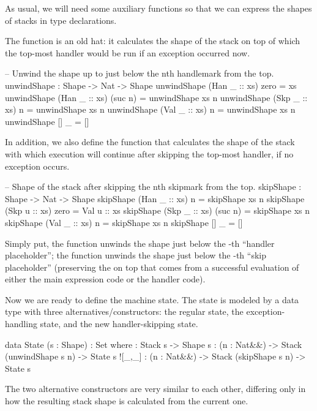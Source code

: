 As usual, we will need some auxiliary functions so that we can express the
shapes of stacks in type declarations.

The function  is an old hat: it calculates the shape of the stack
on top of which the top-most handler would be run if an exception occurred now.
\begin{code}
  -- Unwind the shape up to just below the n\-th handle\-mark from the top.
  unwindShape : Shape -> Nat -> Shape
  unwindShape (Han _ :: xs)  zero   = xs
  unwindShape (Han _ :: xs) (suc n) = unwindShape xs n
  unwindShape (Skp _ :: xs)  n      = unwindShape xs n
  unwindShape (Val _ :: xs)  n      = unwindShape xs n
  unwindShape []            _      = []
\end{code}

\noindent In addition, we also define the function  that calculates
the shape of the stack with which execution will continue after skipping
the top-most handler, if no exception occurs.
\begin{code}
  -- Shape of the stack after skipping the n\-th skip\-mark from the top.
  skipShape : Shape -> Nat -> Shape
  skipShape (Han _ :: xs)  n      = skipShape xs n
  skipShape (Skp u :: xs)  zero   = Val u :: xs
  skipShape (Skp _ :: xs) (suc n) = skipShape xs n
  skipShape (Val _ :: xs)  n      = skipShape xs n
  skipShape []            _      = []
\end{code}

\noindent Simply put, the function  unwinds the shape just
below the -th ``handler placeholder''; the function 
unwinds the shape just below the -th ``skip placeholder'' (preserving
the  on top that comes from a successful evaluation of either the
main expression code or the handler code).

Now we are ready to define the machine state. The state is modeled by a data
type with three alternatives/constructors: the regular state, the
exception-handling state, and the new handler-skipping state.
\begin{code}
  data State (s : Shape) : Set where
    \tick[_] : Stack s -> Shape s
    \x[_,_] : (n : Nat&\!&) -> Stack (unwindShape s n) -> State s
    ![_,_] : (n : Nat&\!&) -> Stack (skipShape s n) -> State s
\end{code}

\noindent The two alternative constructors are very similar to each other,
differing only in how the resulting stack shape is calculated from the current
one.

